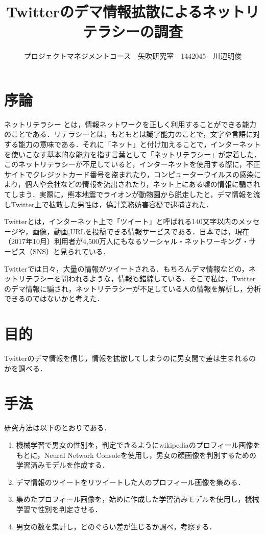 \documentclass[uplatex,twocolumn,dvipdfmx]{jsarticle}
\title{\vspace{-5mm}\fontsize{14pt}{0pt}\selectfont Twitterのデマ情報拡散によるネットリテラシーの調査}
\author{\normalsize プロジェクトマネジメントコース　矢吹研究室　1442045　川辺明俊}
\date{}
\begin{document}
\fontsize{10.5pt}{\baselineskip}\selectfont
\maketitle





\section{序論}

ネットリテラシー とは，情報ネットワークを正しく利用することができる能力のことである．リテラシーとは，もともとは識字能力のことで，文字や言語に対する能力の意味である．それに「ネット」と付け加えることで，インターネットを使いこなす基本的な能力を指す言葉として「ネットリテラシー」が定着した\cite{a}．このネットリテラシーが不足していると，インターネットを使用する際に，不正サイトでクレジットカード番号を盗まれたり，コンピューターウイルスの感染により，個人や会社などの情報を流出されたり，ネット上にある嘘の情報に騙されてしまう．実際に，熊本地震でライオンが動物園から脱走したと，デマ情報を流しTwitter上で拡散した男性は，偽計業務妨害容疑で逮捕された．

Twitterとは，インターネット上で「ツイート」と呼ばれる140文字以内のメッセージや，画像，動画,URLを投稿できる情報サービスである．日本では，現在（2017年10月）利用者が4,500万人にもなるソーシャル・ネットワーキング・サービス（SNS）と見られている．

Twitterでは日々，大量の情報がツイートされる．もちろんデマ情報などの，ネットリテラシーを問われるような，情報も錯綜している．そこで私は，Twitterのデマ情報に騙され，ネットリテラシーが不足している人の情報を解析し，分析できるのではないかと考えた．

\section{目的}

Twitterのデマ情報を信じ，情報を拡散してしまうのに男女間で差は生まれるのかを調べる．

\section{手法}

研究方法は以下のとおりである．

\begin{enumerate}
\item 機械学習で男女の性別を，判定できるようにwikipediaのプロフィール画像をもとに，Neural Network Consoleを使用し，男女の顔画像を判別するための学習済みモデルを作成する．
\item デマ情報のツイートをリツイートした人のプロフィール画像を集める．
\item 集めたプロフィール画像を，始めに作成した学習済みモデルを使用し，機械学習で性別を判定させる．
\item 男女の数を集計し，どのぐらい差が生じるか調べ，考察する．
\end{enumerate}
\end{document}
